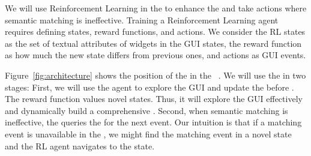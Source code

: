\smallskip
We will use Reinforcement Learning in the \testreuse to enhance the \tam and take actions where semantic matching is ineffective.
Training a Reinforcement Learning agent requires defining  states, reward functions, and actions.
We consider the RL states as the set of textual attributes of widgets in the GUI states, the reward function as how much the new state differs from previous ones, and actions as GUI events.

\smallskip 
Figure~\ref{fig:architecture} shows the position of the \rlaganet in the \testreuse~\architecture.
We will use the \rlaganet in two stages: 
First, we will use the agent to explore the GUI and update the \tam before \testreuse.
The reward function values novel states. Thus,  it will explore the GUI effectively and dynamically build a  comprehensive \tam.
Second, when semantic matching is ineffective, the \selector queries the \rlaganet for the next event.
Our intuition is that if a matching event is unavailable in the \tam, we might find the matching event in a novel state and the RL agent navigates to the state.


